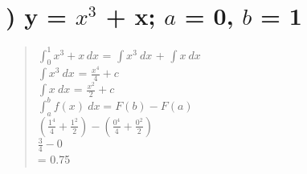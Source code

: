 \fontsize{15}{40}\selectfont
\section*{) y = $x^3$ + x; $a$ = 0, $b$ = 1} \label{fig_amorfas:problema_3}

\begin{quote}
  $\int_{0}^{1} x^3 + x \,dx$ = $\int x^3\ dx$ + $\int x\ dx$ \\
  $\int x^3\ dx $ = $\frac{x^4}{4} + c$ \\
  $\int x\ dx $ = $\frac{x^2}{2} + c$ \\
  $\int_{a}^{b} f(x)\ dx = F(b) - F(a)$ \\
  $(\frac{1^4}{4} + \frac{1^2}{2})  -  (\frac{0^4}{4} + \frac{0^2}{2})$ \\
  $\frac{3}{4} - 0 $ \\
  = 0.75
\end{quote}
